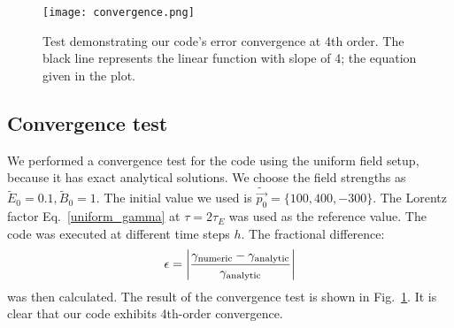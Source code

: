 \documentclass[amsmath,amssymb,nofootinbib,notitlepage,superscriptaddress,twocolumn]{revtex4-2}
\begin{document}
\begin{figure}[h]
    \centering
    \texttt{[image: convergence.png]}\\
    \caption{Test demonstrating our code's error convergence at 4th order. The black line represents the linear function with slope of 4; the equation given in the plot.
    }
    \label{fig:convergence}
\end{figure}

\subsection{Convergence test}

We performed a convergence test for the code using the uniform field setup, because it has exact analytical solutions. We choose the field strengths as $\tilde{E}_0=0.1,\tilde{B}_0=1$. The initial value we used is $\tilde{\vec{p_0}}=\{100,400,-300\}$. The Lorentz factor Eq.~\eqref{uniform_gamma} at $\tau= 2 \tau_E$ was used as the reference value. The code was executed at different time steps $h$. The fractional difference:
\begin{align}
     \epsilon=\left|\frac{\gamma_{\rm numeric}-\gamma_{\rm analytic}}{\gamma_{\rm analytic}}\right|    
\end{align}
was then calculated. The result of the convergence test is shown in Fig.~\ref{fig:convergence}. It is clear that our code exhibits 4th-order convergence.



\end{document}
